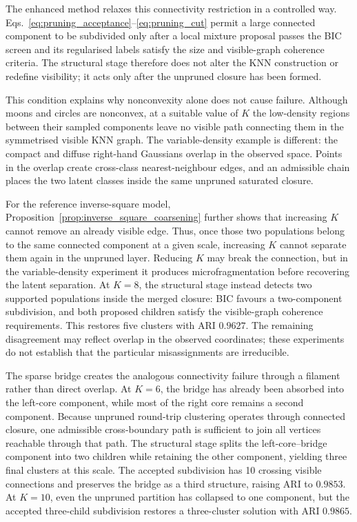 \documentclass[pdflatex,sn-basic,Numbered]{sn-jnl}
\begin{document}
The enhanced method relaxes this connectivity restriction in a controlled
way. Eqs.~\eqref{eq:pruning_acceptance}--\eqref{eq:pruning_cut} permit a
large connected component to be subdivided only after a local mixture proposal
passes the BIC screen and its regularised labels satisfy the size and
visible-graph coherence criteria. The structural stage therefore does
not alter the KNN construction or redefine visibility; it acts only after
the unpruned closure has been formed.

This condition explains why nonconvexity alone does not cause failure.
Although moons and circles are nonconvex, at a suitable value of $K$ the
low-density regions between their sampled components leave no visible path connecting them in the symmetrised visible KNN graph. The variable-density example
is different: the compact and diffuse right-hand Gaussians overlap in the
observed space. Points in the overlap create cross-class nearest-neighbour
edges, and an admissible chain places the two latent classes inside the same
unpruned saturated closure.

For the reference inverse-square model,
Proposition~\ref{prop:inverse_square_coarsening} further shows that increasing
$K$ cannot remove an already visible edge. Thus, once those two populations
belong to the same connected component at a given scale, increasing $K$ cannot
separate them again in the unpruned layer. Reducing $K$ may break the
connection, but in the variable-density experiment it produces
microfragmentation before recovering the latent separation. At $K=8$, the
structural stage instead detects two supported populations inside the merged
closure: BIC favours a two-component subdivision, and both proposed children
satisfy the visible-graph coherence requirements. This restores five clusters
with ARI $0.9627$. The remaining disagreement may reflect overlap in the
observed coordinates; these experiments do not establish that the particular
misassignments are irreducible.

The sparse bridge creates the analogous connectivity failure through a
filament rather than direct overlap. At $K=6$, the bridge has already been
absorbed into the left-core component, while most of the right core remains a
second component. Because unpruned round-trip clustering operates through
connected closure, one admissible cross-boundary path is sufficient to join
all vertices reachable through that path. The structural stage splits the left-core--bridge component into two
children while retaining the other component, yielding three final clusters
at this scale. The accepted subdivision has 10 crossing visible connections
and preserves the bridge as a third structure,
raising ARI to $0.9853$. At $K=10$, even the unpruned partition has collapsed
to one component, but the accepted three-child subdivision restores a
three-cluster solution with ARI $0.9865$.
\end{document}
